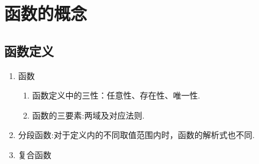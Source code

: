 \chapter{函数的概念}
\section{函数定义}
\begin{enumerate}
	
	\item  函数
	 \begin{enumerate}
		\item 	函数定义中的三性：任意性、存在性、唯一性.
		\item  函数的三要素:两域及对应法则.
	\end{enumerate} 
	\item 分段函数:对于定义内的不同取值范围内时，函数的解析式也不同.
	\item  复合函数

\end{enumerate}
